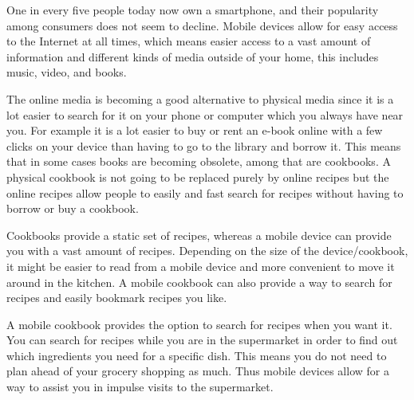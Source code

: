 One in every five people today now own a smartphone\cite{peoplesmartphones}, and their popularity among consumers does not seem to decline\citep{mobilegrow}. Mobile devices allow for easy access to the Internet at all times, which means easier access to a vast amount of information and different kinds of media outside of your home, this includes music, video, and books.

The online media is becoming a good alternative to physical media since it is a lot easier to search for it on your phone or computer which you always have near you. 
For example it is a lot easier to buy or rent an e-book online with a few clicks on your device than having to go to the library and borrow it. 
This means that in some cases books are becoming obsolete, among that are cookbooks. 
A physical cookbook is not going to be replaced purely by online recipes but the online recipes allow people to easily and fast search for recipes without having to borrow or buy a cookbook.

Cookbooks provide a static set of recipes, whereas a mobile device can provide you with a vast amount of recipes. Depending on the size of the device/cookbook, it might be easier to read from a mobile device and more convenient to move it around in the kitchen. A mobile cookbook can also provide a way to search for recipes and easily bookmark recipes you like.

A mobile cookbook provides the option to search for recipes when you want it. You can search for recipes while you are in the supermarket in order to find out which ingredients you need for a specific dish. This means you do not need to plan ahead of your grocery shopping as much. Thus mobile devices allow for a way to assist you in impulse visits to the supermarket.
